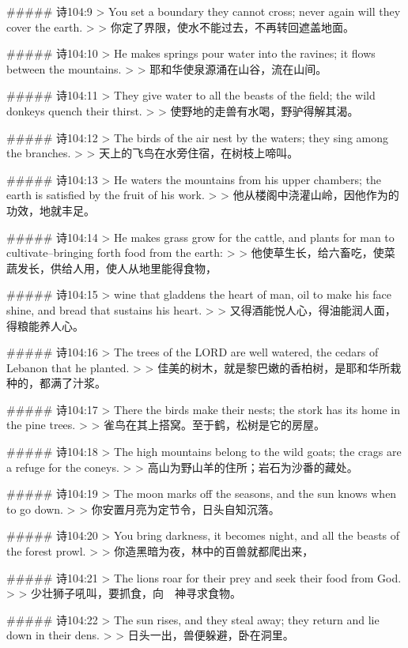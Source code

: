 ##### 诗104:9
> You set a boundary they cannot cross; never again will they cover the earth.
>
> 你定了界限，使水不能过去，不再转回遮盖地面。


##### 诗104:10
> He makes springs pour water into the ravines; it flows between the mountains.
>
> 耶和华使泉源涌在山谷，流在山间。


##### 诗104:11
> They give water to all the beasts of the field; the wild donkeys quench their thirst.
>
> 使野地的走兽有水喝，野驴得解其渴。


##### 诗104:12
> The birds of the air nest by the waters; they sing among the branches.
>
> 天上的飞鸟在水旁住宿，在树枝上啼叫。


##### 诗104:13
> He waters the mountains from his upper chambers; the earth is satisfied by the fruit of his work.
>
> 他从楼阁中浇灌山岭，因他作为的功效，地就丰足。


##### 诗104:14
> He makes grass grow for the cattle, and plants for man to cultivate--bringing forth food from the earth:
>
> 他使草生长，给六畜吃，使菜蔬发长，供给人用，使人从地里能得食物，


##### 诗104:15
> wine that gladdens the heart of man, oil to make his face shine, and bread that sustains his heart.
>
> 又得酒能悦人心，得油能润人面，得粮能养人心。


##### 诗104:16
> The trees of the LORD are well watered, the cedars of Lebanon that he planted.
>
> 佳美的树木，就是黎巴嫩的香柏树，是耶和华所栽种的，都满了汁浆。


##### 诗104:17
> There the birds make their nests; the stork has its home in the pine trees.
>
> 雀鸟在其上搭窝。至于鹤，松树是它的房屋。


##### 诗104:18
> The high mountains belong to the wild goats; the crags are a refuge for the coneys.
>
> 高山为野山羊的住所；岩石为沙番的藏处。


##### 诗104:19
> The moon marks off the seasons, and the sun knows when to go down.
>
> 你安置月亮为定节令，日头自知沉落。


##### 诗104:20
> You bring darkness, it becomes night, and all the beasts of the forest prowl.
>
> 你造黑暗为夜，林中的百兽就都爬出来，


##### 诗104:21
> The lions roar for their prey and seek their food from God.
>
> 少壮狮子吼叫，要抓食，向　神寻求食物。


##### 诗104:22
> The sun rises, and they steal away; they return and lie down in their dens.
>
> 日头一出，兽便躲避，卧在洞里。



